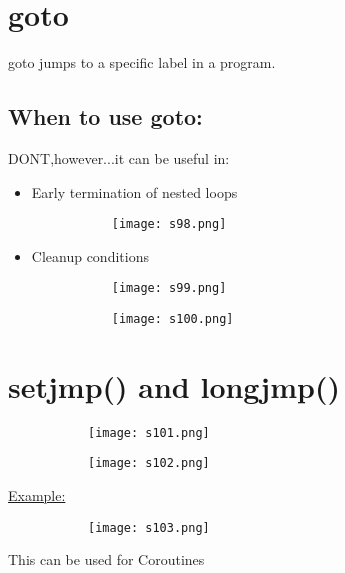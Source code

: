 \documentclass[8pt]{extreport}
\begin{document}
\section{goto}

goto jumps to a specific label in a program.

\subsection{When to use goto:}
DONT,however...it can be useful in:
\begin{itemize}
\item Early termination of nested loops
\begin{figure}[H]
\centering
\begin{subfigure}[b]{0.4\linewidth}
\texttt{[image: s98.png]}
\end{subfigure}
\end{figure}
\item Cleanup conditions
\begin{figure}[H]
\centering
\begin{subfigure}[b]{0.4\linewidth}
\texttt{[image: s99.png]}
\end{subfigure}
\begin{subfigure}[b]{0.4\linewidth}
\texttt{[image: s100.png]}
\end{subfigure}
\end{figure}
\end{itemize}

\section{setjmp() and longjmp()}
\begin{figure}[H]
\centering
\begin{subfigure}[b]{0.4\linewidth}
\texttt{[image: s101.png]}
\end{subfigure}
\begin{subfigure}[b]{0.4\linewidth}
\texttt{[image: s102.png]}
\end{subfigure}
\end{figure}
\underline{Example:}
\begin{figure}[H]
\centering
\begin{subfigure}[b]{0.4\linewidth}
\texttt{[image: s103.png]}
\end{subfigure}
\end{figure}
This can be used for Coroutines
\end{document}
